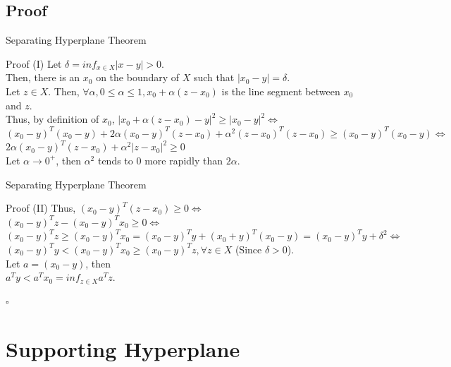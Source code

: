 \documentclass{beamer}
\begin{document}
\subsection{Proof}
\begin{frame}{Separating Hyperplane Theorem}
\begin{block}{Proof (I) \cite{1}}
Let $\delta = inf_{x \in X} |x - y| > 0.$ \\
Then, there is an $x_0$ on the boundary of $X$ such that $|x_0 - y| = \delta.$ \\
Let $z \in X$. Then, $\forall \alpha, 0 \leq \alpha \leq 1, x_0 + \alpha (z - x_0)$ is the line segment between $x_0$ and $z$. \\ 
Thus, by definition of $x_0$, $|x_0 + \alpha (z - x_0) - y|^2 \geq |x_0 - y|^2 \Leftrightarrow$ \\
$(x_0 - y)^T (x_0 - y) + 2 \alpha (x_0 - y)^T (z - x_0) + \alpha^2 (z - x_0)^T (z - x_0) \geq (x_0 - y)^T (x_0 - y) \Leftrightarrow$ \\
$2 \alpha (x_0 - y)^T (z - x_0) + \alpha^2 |z - x_0|^2 \geq 0$ \\
Let $\alpha \to 0^+$, then $\alpha^2$ tends to 0 more rapidly than $2 \alpha$. \\
\end{block}
\end{frame}

\begin{frame}{Separating Hyperplane Theorem}
\begin{block}{Proof (II)}
Thus, $(x_0 - y)^T (z - x_0) \geq 0 \Leftrightarrow$ \\
$(x_0 - y)^T z - (x_0 - y)^T x_0 \geq 0 \Leftrightarrow$ \\
$(x_0 - y)^T z \geq (x_0 - y)^T x_0 = (x_0 - y)^T y + (x_0 + y)^T (x_0 - y) = (x_0 - y)^T y + \delta^2 \Leftrightarrow$ \\
$(x_0 - y)^T y < (x_0 - y)^T x_0 \geq (x_0 -y)^T z, \forall z \in X$ (Since $\delta > 0$). \\
Let $a = (x_0 - y)$, then \\
$a^T y < a^T x_0 = inf_{z \in X} a^T z.$
\begin{flushright}$\square$\end{flushright}
\end{block}
\end{frame}


\section{Supporting Hyperplane}
\end{document}
